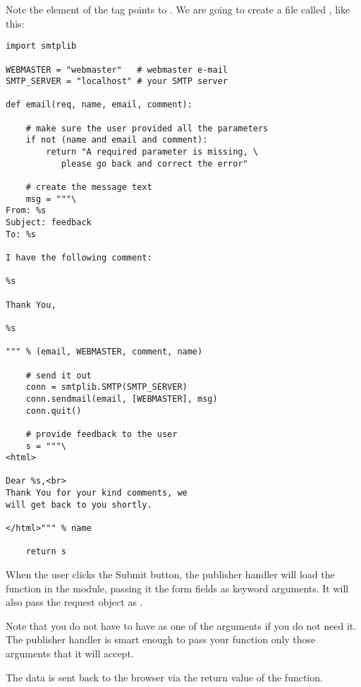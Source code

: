 Note the  element of the  tag points to
. We are going to create a file called
, like this:

\begin{verbatim}
import smtplib

WEBMASTER = "webmaster"   # webmaster e-mail
SMTP_SERVER = "localhost" # your SMTP server

def email(req, name, email, comment):

    # make sure the user provided all the parameters
    if not (name and email and comment):
        return "A required parameter is missing, \
	       please go back and correct the error"

    # create the message text
    msg = """\
From: %s                                                                                                                                           
Subject: feedback
To: %s

I have the following comment:

%s

Thank You,

%s

""" % (email, WEBMASTER, comment, name)

    # send it out
    conn = smtplib.SMTP(SMTP_SERVER)
    conn.sendmail(email, [WEBMASTER], msg)
    conn.quit()

    # provide feedback to the user
    s = """\
<html>

Dear %s,<br>                                                                                                                                       
Thank You for your kind comments, we
will get back to you shortly.

</html>""" % name

    return s
\end{verbatim}

When the user clicks the Submit button, the publisher handler will
load the  function in the  module,
passing it the form fields as keyword arguments. It will also pass the
request object as .

Note that you do not have to have \code{req} as one of the arguments
if you do not need it. The publisher handler is smart enough to pass
your function only those arguments that it will accept.

The data is sent back to the browser via the return value of the
function.

